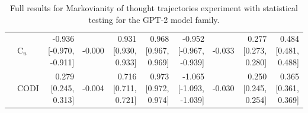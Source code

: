 \begin{table}[h!]
\begin{tabular}{llrrrrrrrr}
 & C$_u$ & -0.936 [-0.970, -0.911] & -0.000 & 0.931 [0.930, 0.933] & 0.968 [0.967, 0.969] & -0.952 [-0.967, -0.939] & -0.033 & 0.277 [0.273, 0.280] & 0.484 [0.481, 0.488] \\
 & CODI & 0.279 [0.245, 0.313] & -0.004 & 0.716 [0.711, 0.721] & 0.973 [0.972, 0.974] & -1.065 [-1.093, -1.039] & -0.030 & 0.250 [0.245, 0.254] & 0.365 [0.361, 0.369] \\
\bottomrule
\end{tabular}
\caption{Full results for Markovianity of thought trajectories experiment with statistical testing for the GPT-2 model family.}
\label{tab:markovianity_gpt2}
\end{table}
